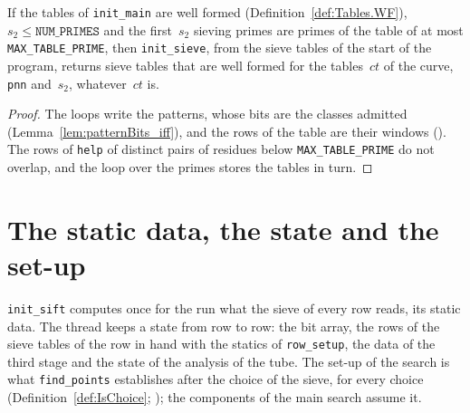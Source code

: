 \begin{lemma}\label{lem:initSieve_spec}
  \leanok
  If the tables of \texttt{init\_main} are well formed (Definition~\ref{def:Tables.WF}),
  $s_2 \le \texttt{NUM\_PRIMES}$ and the first~$s_2$ sieving primes are primes of the table of at
  most \texttt{MAX\_TABLE\_PRIME}, then \texttt{init\_sieve}, from the sieve tables of the start of
  the program, returns sieve tables that are well formed for the tables~$ct$ of the curve,
  \texttt{pnn} and~$s_2$, whatever~$ct$ is.
\end{lemma}

\begin{proof}
  \leanok
  The loops write the patterns, whose bits are the classes admitted
  (Lemma~\ref{lem:patternBits_iff}), and the rows of the table are their windows
  (). The rows of \texttt{help} of distinct pairs of residues
  below \texttt{MAX\_TABLE\_PRIME} do not overlap, and the loop over the primes stores the tables
  in turn.
\end{proof}

\section{The static data, the state and the set-up}\label{sec:siftData}

\texttt{init\_sift} computes once for the run what the sieve of every row reads, its static data.
The thread keeps a state from row to row: the bit array, the rows of the sieve tables of the row
in hand with the statics of \texttt{row\_setup}, the data of the third stage and the state of the
analysis of the tube. The set-up of the search is what \texttt{find\_points} establishes after the
choice of the sieve, for every choice (Definition~\ref{def:IsChoice};
); the components of the main search assume it.

